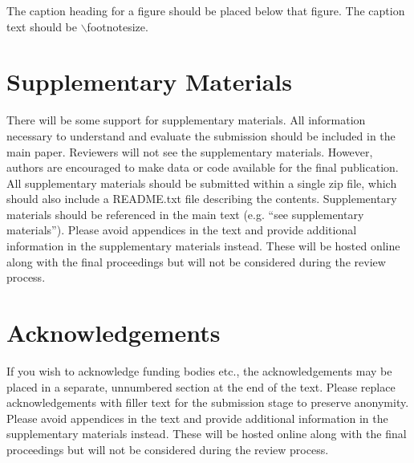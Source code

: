 \documentclass{evolang}
\begin{document}
The caption heading for a figure should be placed below that figure.
The caption text should be $\backslash$footnotesize.

\section{Supplementary Materials}

There will be some support for supplementary materials.  All information necessary to understand and evaluate the submission should be included in the main paper.  Reviewers will not see the supplementary materials.  However, authors are encouraged to make data or code available for the final publication.  All supplementary materials should be submitted within a single zip file, which should also include a README.txt file describing the contents.  Supplementary materials should be referenced in the main text (e.g. ``see supplementary materials''). Please avoid appendices in the text and provide additional information in the supplementary materials instead. These will be hosted online along with the final proceedings but will not be considered during the review process.


\section*{Acknowledgements}

If you wish to acknowledge funding bodies etc., the acknowledgements may be placed in a separate, unnumbered section at the end of the text. Please replace acknowledgements with filler text for the submission stage to preserve anonymity. Please avoid appendices in the text and provide additional information in the supplementary materials instead. These will be hosted online along with the final proceedings but will not be considered during the review process.



 
\end{document}
